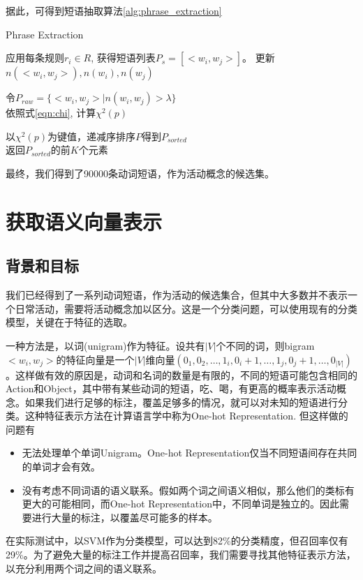 据此，可得到短语抽取算法\ref{alg:phrase_extraction}
\begin{algorithm}
\caption{Phrase Extraction}
\label{alg:phrase_extraction}

 {
    应用每条规则$r_i \in R$, 获得短语列表$P_{s}=[<w_i, w_j>]$。
     {
    	更新$n(<w_i, w_j>), n(w_i), n(w_j)$
    }
}

令$P_{raw}=\{<w_i, w_j>|n(w_i, w_j)>\lambda \}$\\

 {
	依照式\ref{eqn:chi}, 计算$\chi^2(p)$
}

以$\chi^2(p)$为键值，递减序排序$P$得到$P_{sorted}$\\

返回$P_{sorted}$的前$K$个元素
\end{algorithm}
最终，我们得到了90000条动词短语，作为活动概念的候选集。

\section{获取语义向量表示}
\label{sec:nnlm}
\subsection{背景和目标}
我们已经得到了一系列动词短语，作为活动的候选集合，但其中大多数并不表示一个日常活动，需要将活动概念加以区分。这是一个分类问题，可以使用现有的分类模型，关键在于特征的选取。

一种方法是，以词(unigram)作为特征。设共有$|V|$个不同的词，则bigram$<w_i, w_j>$的特征向量是一个$|V|$维向量$(0_1, 0_2,\ldots, 1_i, 0_i+1,\ldots, 1_j, 0_j+1, \ldots, 0_{|V|})$。这样做有效的原因是，动词和名词的数量是有限的，不同的短语可能包含相同的Action和Object，其中带有某些动词的短语，吃、喝，有更高的概率表示活动概念。如果我们进行足够的标注，覆盖足够多的情况，就可以对未知的短语进行分类。这种特征表示方法在计算语言学中称为One-hot Representation. 
但这样做的问题有
\begin{itemize}
\item 无法处理单个单词Unigram。One-hot Representation仅当不同短语间存在共同的单词才会有效。
\item 没有考虑不同词语的语义联系。假如两个词之间语义相似，那么他们的类标有更大的可能相同，而One-hot Representation中，不同单词是独立的。因此需要进行大量的标注，以覆盖尽可能多的样本。
\end{itemize}
在实际测试中，以SVM作为分类模型，可以达到82\%的分类精度，但召回率仅有29\%。为了避免大量的标注工作并提高召回率，我们需要寻找其他特征表示方法，以充分利用两个词之间的语义联系。

